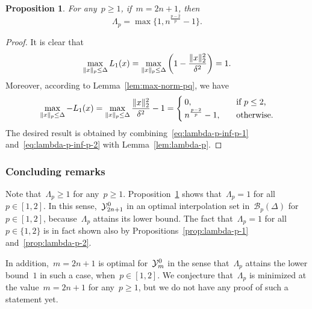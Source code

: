 \documentclass[draft]{article}
\numberwithin{equation}{section}
\theoremstyle{definition}
\theoremstyle{plain}
\newtheorem{proposition}{Proposition}[section]
\newcommand{\lagp}[1][]{L\ifblank{#1}{}{_{#1}}}
\newcommand{\norm}[2][]{#1\lVert#2#1\rVert}
\newcommand{\set}[2][]{#1\{#2#1\}}
\newcommand{\xpt}[1][]{\mathcal{Y}\ifblank{#1}{}{^{#1}}}
\begin{document}
\begin{proposition}
    \label{prop:lambda-p-opt}
    For any~$p \ge 1$, if~$m = 2n + 1$, then
    \begin{equation*}
        \Lambda_p = \max \set[\big]{1, n^{\frac{p - 2}{p}} - 1}.
    \end{equation*}
\end{proposition}

\begin{proof}
    It is clear that
    \begin{equation}
        \label{eq:lambda-p-inf-p-1}
        \max_{\norm{x}_p \le \Delta} \lagp[1](x) = \max_{\norm{x}_p \le \Delta} \bigg( 1 - \frac{\norm{x}_2^2}{\delta^2} \bigg) = 1.
    \end{equation}
    Moreover, according to Lemma~\ref{lem:max-norm-pq}, we have
    \begin{equation}
        \label{eq:lambda-p-inf-p-2}
        \max_{\norm{x}_p \le \Delta} -\lagp[1](x) = \max_{\norm{x}_p \le \Delta} \frac{\norm{x}_2^2}{\delta^2} - 1 =
        \begin{cases}
            0,                          & \quad \text{if~$p \le 2$,}\\
            n^{\frac{p - 2}{p}} - 1,    & \quad \text{otherwise.}
        \end{cases}
    \end{equation}
    The desired result is obtained by combining~\eqref{eq:lambda-p-inf-p-1} and~\eqref{eq:lambda-p-inf-p-2} with Lemma~\ref{lem:lambda-p}.
\end{proof}

\subsubsection{Concluding remarks}

Note that~$\Lambda_p \ge 1$ for any~$p \ge 1$.
Proposition~\ref{prop:lambda-p-opt} shows that~$\Lambda_p = 1$ for all~$p \in [1, 2]$.
In this sense,~$\xpt[0]_{2n + 1}$ in an optimal interpolation set in~$\mathcal{B}_p(\Delta)$ for~$p \in [1, 2]$, because~$\Lambda_p$ attains its lower bound.
The fact that~$\Lambda_p = 1$ for all~$p \in \set{1, 2}$ is in fact shown also by Propositions~\ref{prop:lambda-p-1} and~\ref{prop:lambda-p-2}.

In addition,~$m = 2n + 1$ is optimal for~$\xpt[0]_m$ in the sense that~$\Lambda_p$ attains the lower bound~$1$ in such a case, when~$p \in [1, 2]$.
We conjecture that~$\Lambda_p$ is minimized at the value~$m = 2n + 1$ for any~$p \ge 1$, but we do not have any proof of such a statement yet.
\end{document}
